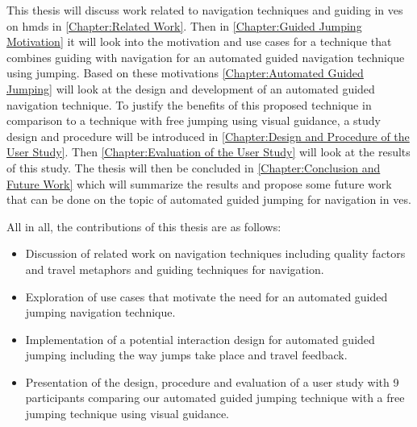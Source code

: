 This thesis will discuss work related to navigation techniques and guiding in \acrshort{ve}s on \acrfull{hmd}s in \cref{Chapter:Related Work}. Then in \cref{Chapter:Guided Jumping Motivation} it will look into the motivation and use cases for a technique that combines guiding with navigation for an automated guided navigation technique using jumping. Based on these motivations \cref{Chapter:Automated Guided Jumping} will look at the design and development of an automated guided navigation technique. To justify the benefits of this proposed technique in comparison to a technique with free jumping using visual guidance, a study design and procedure will be introduced in \cref{Chapter:Design and Procedure of the User Study}. Then \cref{Chapter:Evaluation of the User Study} will look at the results of this study. The thesis will then be concluded in \cref{Chapter:Conclusion and Future Work} which will summarize the results and propose some future work that can be done on the topic of automated guided jumping for navigation in \acrshort{ve}s.

All in all, the contributions of this thesis are as follows:
\begin{itemize}
	\item Discussion of related work on navigation techniques including quality factors and travel metaphors and guiding techniques for navigation.
	\item Exploration of use cases that motivate the need for an automated guided jumping navigation technique.
	\item Implementation of a potential interaction design for automated guided jumping including the way jumps take place and travel feedback.
	\item Presentation of the design, procedure and evaluation of a user study with 9 participants comparing our automated guided jumping technique with a free jumping technique using visual guidance.
\end{itemize}
